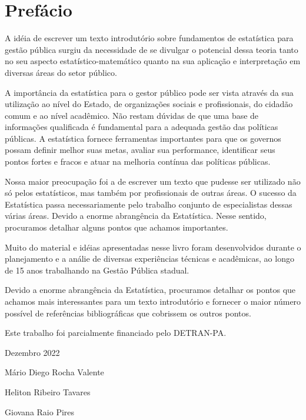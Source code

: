 \chapter*{Prefácio}

\inic A idéia de escrever um texto introdutório sobre fundamentos de estatística para gestão pública surgiu da necessidade de se divulgar o potencial dessa teoria tanto no
seu aspecto estatístico-matemático quanto na sua aplicação e
interpretação em diversas áreas do setor público.\vskip0.3cm



A importância da estatística para o gestor público pode ser vista através da sua
utilização ao nível do Estado, de organizações sociais e profissionais, do cidadão comum e ao nível acadêmico. Não restam dúvidas de que uma base de informações qualificada é fundamental para a adequada gestão das políticas públicas.  A estatística fornece ferramentas importantes para que os governos possam definir melhor suas metas, avaliar sua performance, identificar seus pontos fortes e fracos e atuar na melhoria contínua das políticas públicas.
\vskip0.3cm

Nossa maior preocupação foi a de escrever um texto que pudesse ser
utilizado não só pelos estatísticos, mas também por profissionais de outras áreas. O sucesso da Estatística passa necessariamente
pelo trabalho conjunto de especialistas dessas várias áreas. Devido
a enorme abrangência da Estatística. Nesse sentido, procuramos detalhar
alguns pontos que achamos importantes. \vst

Muito do material e idéias apresentadas nesse livro foram
desenvolvidos durante o planejamento e a análie de diversas experiências técnicas e acadêmicas, ao longo de 15 anos trabalhando na Gestão Pública stadual.
\vst 

\newpage


Devido a enorme abrangência da Estatística, procuramos detalhar os pontos
que achamos mais interessantes para um texto introdutório e
fornecer o maior número possível de referências bibliográficas que
cobrissem os outros pontos.\vst

Este trabalho foi parcialmente financiado pelo DETRAN-PA.

\vst

\begin{centering}

\vst

Dezembro 2022 
\vsm

Mário Diego Rocha Valente

Heliton Ribeiro Tavares

Giovana Raio Pires


\end{centering}
